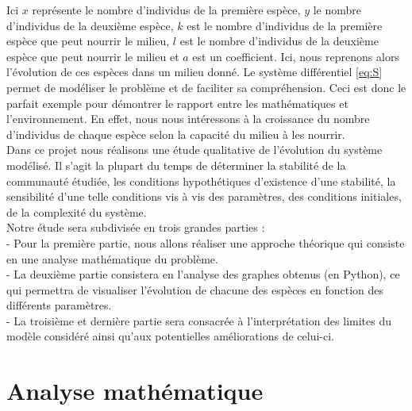 \documentclass{article}
\begin{document}
Ici $x$ représente le nombre d’individus de la première espèce, $y$ le nombre d’individus de la
deuxième espèce, $k$ est le nombre d’individus de la première espèce que peut nourrir le milieu, $l$ est le nombre d’individus de la deuxième espèce que peut nourrir le milieu et $a$ est un coefficient. Ici, nous reprenons alors l'évolution de ces espèces dans un milieu donné. Le système différentiel \eqref{eq:S} permet de modéliser le problème et de faciliter sa compréhension. Ceci est donc le parfait exemple pour démontrer le rapport entre les mathématiques et l'environnement. En effet, nous nous intéressons à la croissance du nombre d'individus de chaque espèce selon la capacité du milieu à les nourrir.\\

Dans ce projet nous réalisons une étude qualitative de l’évolution du système modélisé. Il s’agit la plupart du temps de déterminer la stabilité de la communauté étudiée, les conditions hypothétiques d’existence d’une stabilité, la sensibilité d’une telle conditions vis à vis des paramètres, des conditions initiales, de la complexité du système.\\

Notre étude sera subdivisée en trois grandes parties :\\

- Pour la première partie, nous allons réaliser une approche théorique qui consiste en une analyse mathématique du problème. \\

- La deuxième partie consistera en l'analyse des graphes obtenus (en Python), ce qui permettra de visualiser l'évolution de chacune des espèces en fonction des différents paramètres.\\

- La troisième et dernière partie sera consacrée à l'interprétation des limites du modèle considéré ainsi qu'aux potentielles améliorations de celui-ci.



\newpage

\setcounter{secnumdepth}{2}
\section{Analyse mathématique}
\end{document}
